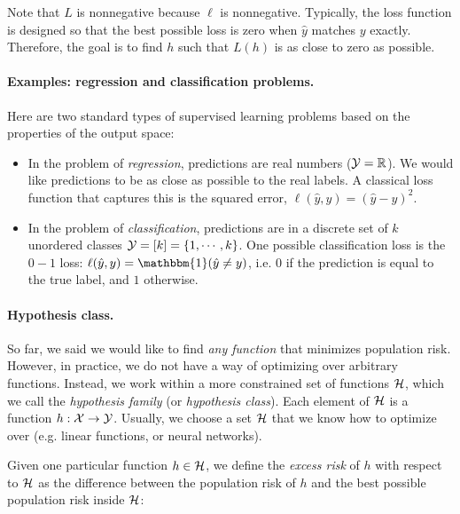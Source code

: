 Note that $L$ is nonnegative because $\ell$ is nonnegative. Typically, the loss function is designed so that the best possible loss is zero when $\hat{y}$ matches $y$ exactly. Therefore, the goal is to find $h$ such that $L(h)$ is as close to zero as possible. %

\paragraph{Examples: regression and classification problems.}

Here are two standard types of supervised learning problems based on the properties of the output space:

\begin{itemize}
    \item In the problem of \emph{regression}, predictions are real numbers ($\mathcal Y = \mathbb R$). We would like predictions to be as close as possible to the real labels. A classical loss function that captures this is the squared error, $\ell(\hat{y}, y) = (\hat{y} - y)^2$.
    \item In the problem of \emph{classification}, predictions are in a discrete set of $k$ unordered classes $\mathcal Y = [k] = \{1, \cdots, k \}$. One possible classification loss is the $0-1$ loss: $\ell(\hat{y}, y) = \mathbbm{1}(\hat{y} \neq y)$, i.e. $0$ if the prediction is equal to the true label, and $1$ otherwise.
\end{itemize}

\paragraph{Hypothesis class.}

So far, we said we would like to find \emph{any function} that minimizes population risk. However, in practice, we do not have a way of optimizing over arbitrary functions. Instead, we work within a more constrained set of functions $\mathcal H$, which we call the \emph{hypothesis family} (or \emph{hypothesis class}). Each element of $\mathcal H$ is a function $h : \mathcal X \rightarrow \mathcal Y$. Usually, we choose a set $\mathcal H$ that we know how to optimize over (e.g. linear functions, or neural networks).

Given one particular function $h \in \mathcal H$, we define the \emph{excess risk} of $h$ with respect to $\mathcal H$ as the difference between the population risk of $h$ and the best possible population risk inside $\mathcal H$:

